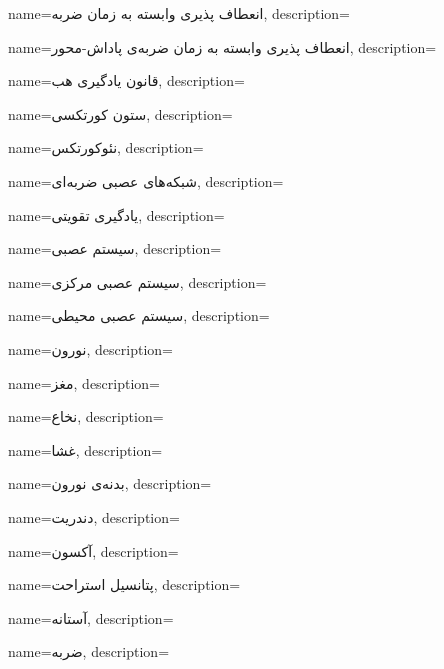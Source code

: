 {
	name={انعطاف پذیری وابسته به زمان ضربه},
	description=\hfill{}
}

{
	name={انعطاف پذیری وابسته به زمان ضربه‌ی پاداش-محور},
	description=\hfill{}
}

{
    name={قانون یادگیری هب},
    description=\hfill{}
}

{
name={ستون‌ کورتکسی},
description=\hfill{}
}

{
name={نئوکورتکس},
description=\hfill{}
}

{
	name={شبکه‌های عصبی ضربه‌ای},
	description=\hfill{}
}

{
	name={یادگیری تقویتی},
	description=\hfill{}
}

{
	name={سیستم عصبی},
	description=\hfill{}
}

{
	name={سیستم عصبی مرکزی},
	description=\hfill{}
}

{
	name={سیستم عصبی محیطی},
	description=\hfill{}
}

{
	name={نورون},
	description=\hfill{}
}

{
	name={مغز},
	description=\hfill{}
}

{
	name={نخاع},
	description=\hfill{}
}

{
	name={غشا},
	description=\hfill{}
}

{
	name={بدنه‌ی نورون},
	description=\hfill{}
}

{
	name={دندریت},
	description=\hfill{}
}

{
	name={آکسون},
	description=\hfill{}
}

{
	name={پتانسیل استراحت},
	description=\hfill{}
}

{
	name={آستانه},
	description=\hfill{}
}

{
	name={ضربه},
	description=\hfill{}
}

